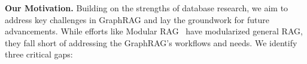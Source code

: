 


\textbf{Our Motivation.}
Building on the strengths of database research, we aim to address key challenges in GraphRAG and lay the groundwork for future advancements. 
While efforts like Modular RAG~\cite{modularRag} have modularized general RAG, they fall short of addressing the GraphRAG's workflows and needs.
We identify three critical gaps:


